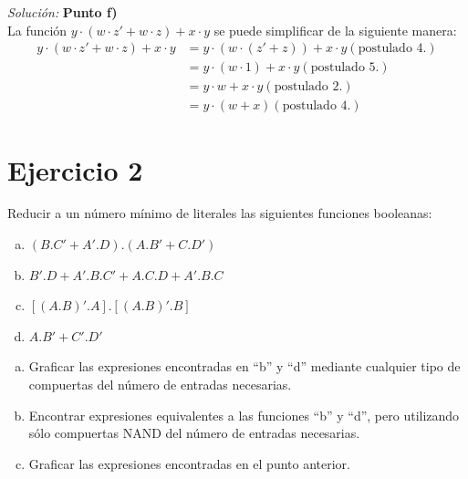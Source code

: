 \documentclass{article}
\newenvironment{solution}
    {\textit{Solución:}}
    {}
\begin{document}
\begin{solution}
\textbf{Punto f)}\\
La función $y \cdot (w \cdot z' + w \cdot z) + x \cdot y$ se puede simplificar de la siguiente manera:
\begin{align*}
    y \cdot (w \cdot z' + w \cdot z) + x \cdot y &= y \cdot (w \cdot (z' + z)) + x \cdot y (\text{postulado 4.}) \\
    &= y \cdot (w \cdot 1) + x \cdot y (\text{postulado 5.}) \\
    &= y \cdot w + x \cdot y (\text{postulado 2.}) \\
    &= y \cdot (w + x) (\text{postulado 4.})
\end{align*}
\end{solution}

\section*{Ejercicio 2}
Reducir a un número mínimo de literales las siguientes funciones booleanas:
\begin{enumerate}[a)]
    \item $(B.C' + A'.D).(A.B' + C.D')$
    \item $B'.D + A'.B.C' + A.C.D + A'.B.C$
    \item $[(A.B)'.A].[(A.B)'.B]$
    \item $A.B' + C'.D'$
\end{enumerate}
\begin{enumerate}[a), leftmargin=*]
    \item Graficar las expresiones encontradas en “b” y “d” mediante cualquier tipo de compuertas del número de entradas necesarias.
    \item Encontrar expresiones equivalentes a las funciones “b” y “d”, pero utilizando sólo compuertas NAND del número de entradas necesarias.
    \item Graficar las expresiones encontradas en el punto anterior.
\end{enumerate}
\end{document}
